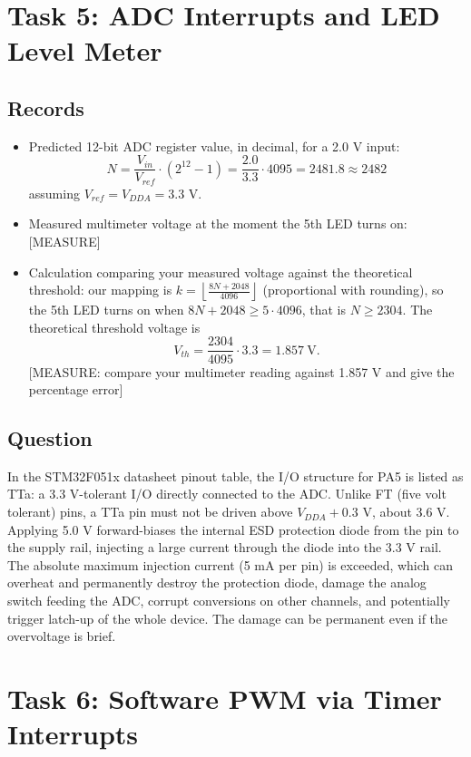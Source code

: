 \documentclass[11pt]{article}
\begin{document}
\section{Task 5: ADC Interrupts and LED Level Meter}

\subsection{Records}
\begin{itemize}
    \item Predicted 12-bit ADC register value, in decimal, for a 2.0 V input:
    \[
        N = \frac{V_{in}}{V_{ref}} \cdot (2^{12} - 1) = \frac{2.0}{3.3} \cdot 4095 = 2481.8 \approx 2482
    \]
    assuming $V_{ref} = V_{DDA} = 3.3$ V.
    \item Measured multimeter voltage at the moment the 5th LED turns on: [MEASURE]
    \item Calculation comparing your measured voltage against the theoretical threshold: our mapping is $k = \left\lfloor \frac{8N + 2048}{4096} \right\rfloor$ (proportional with rounding), so the 5th LED turns on when $8N + 2048 \geq 5 \cdot 4096$, that is $N \geq 2304$. The theoretical threshold voltage is
    \[
        V_{th} = \frac{2304}{4095} \cdot 3.3 = 1.857~\text{V}.
    \]
    [MEASURE: compare your multimeter reading against 1.857 V and give the percentage error]
\end{itemize}

\subsection{Question}
In the STM32F051x datasheet pinout table, the I/O structure for PA5 is listed as TTa: a 3.3 V-tolerant I/O directly connected to the ADC. Unlike FT (five volt tolerant) pins, a TTa pin must not be driven above $V_{DDA} + 0.3$ V, about 3.6 V. Applying 5.0 V forward-biases the internal ESD protection diode from the pin to the supply rail, injecting a large current through the diode into the 3.3 V rail. The absolute maximum injection current (5 mA per pin) is exceeded, which can overheat and permanently destroy the protection diode, damage the analog switch feeding the ADC, corrupt conversions on other channels, and potentially trigger latch-up of the whole device. The damage can be permanent even if the overvoltage is brief.

\section{Task 6: Software PWM via Timer Interrupts}
\end{document}

